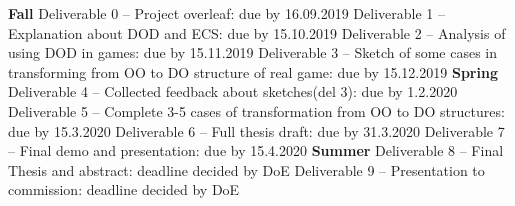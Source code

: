 \textbf{Fall}  \newline
Deliverable 0 – Project overleaf: due by 16.09.2019\newline
Deliverable 1 – Explanation about DOD and ECS:  due by 15.10.2019\newline
Deliverable 2 – Analysis of using DOD in games:  due by 15.11.2019\newline
Deliverable 3 – Sketch of some cases in transforming from OO to DO structure of real game: due by 15.12.2019\newline
 \newline
\textbf{Spring} \newline
Deliverable 4 – Collected feedback about sketches(del 3): due by 1.2.2020\newline
Deliverable 5 – Complete 3-5 cases of transformation from OO to DO structures: due by 15.3.2020\newline
Deliverable 6 – Full thesis draft: due by 31.3.2020\newline
Deliverable 7 – Final demo and presentation: due by 15.4.2020\newline
 \newline
\textbf{Summer}  \newline
Deliverable 8 – Final Thesis and abstract: deadline decided by DoE\newline
Deliverable 9 – Presentation to commission: deadline decided by DoE\newline




